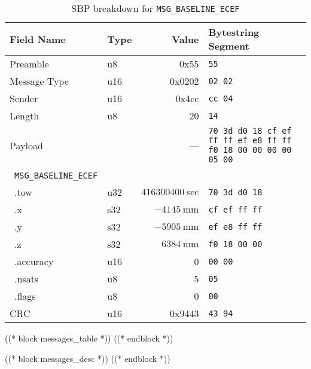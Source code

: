 \documentclass{article}
\numberwithin{table}{subsection}
\numberwithin{field}{subsection}
\begin{document}
\begin{table}[h]
  \centering
  \begin{tabular}{llrl}
    \toprule
    Field Name & Type & Value & Bytestring Segment\\
    \midrule
    {Preamble} & u8 & 0x55 & \verb|55| \\
    {Message Type}& u16 & 0x0202 & \verb|02 02| \\
    {Sender}& u16 & 0x4cc & \verb!cc 04! \\
    {Length}& u8 & 20 &  \verb!14! \\
    {Payload}& & --- & \verb!70 3d d0 18 cf ef ff ff ef e8 ff ff f0 18 00 00 00 00 05 00! \\
    \quad~\texttt{MSG\_BASELINE\_ECEF} & & & \\
    \quad~.tow & u32 & $416300400~\textrm{sec}$  & \verb!70 3d d0 18! \\
    \quad~.x & s32 & $-4145~\textrm{mm}$  & \verb!cf ef ff ff! \\
    \quad~.y & s32 & $-5905~\textrm{mm}$  & \verb!ef e8 ff ff! \\
    \quad~.z & s32 & $6384~\textrm{mm}$  & \verb!f0 18 00 00! \\
    \quad~.accuracy & u16 & 0 & \verb!00 00! \\
    \quad~.nsats & u8 & 5 & \verb!05! \\
    \quad~.flags & u8 & 0 & \verb!00! \\
    {CRC} & u16 & 0x9443 & \verb!43 94! \\
    \bottomrule
  \end{tabular}
  \caption{SBP breakdown for \texttt{MSG\_BASELINE\_ECEF}}
  \label{tab:example_breakdown}
\end{table}

((* block messages_table *))
((* endblock *))

((* block messages_desc *))
((* endblock *))
\end{document}
